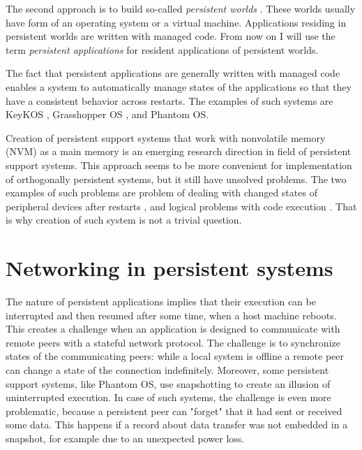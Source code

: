The second approach is to build so-called \textit{persistent worlds} 
\cite{atkinson1995orthogonally}. These worlds usually have form of an operating
system or a virtual machine. Applications residing in persistent worlds are
written with managed code. From now on I will use the term \textit{persistent
applications} for resident applications of persistent worlds.

The fact that persistent applications are generally written with managed code
enables a system to automatically manage states of the applications so that they
have a consistent behavior across restarts. The examples of such systems are
KeyKOS \cite{bomberger1992keykos}, Grasshopper OS \cite{dearle1994grasshopper},
and Phantom OS. 

Creation of persistent support systems that work with nonvolatile memory (NVM)
as a main memory is an emerging research direction in field of persistent
support systems. This approach seems to be more convenient for implementation of
orthogonally persistent systems, but it still have unsolved problems.  The two
examples of such problems are problem of dealing with changed states of
peripheral devices after restarts \cite{berthou2018peripheral}, and logical
problems with code execution \cite{ransford2014nonvolatile}. That is why
creation of such system is not a trivial question. 

\section{Networking in persistent systems}
\label{sec:lr:networking}

The nature of persistent applications implies that their execution can be
interrupted and then resumed after some time, when a host machine reboots. This
creates a challenge when an application is designed to communicate with remote
peers with a stateful network protocol. The challenge is to synchronize
states of the communicating peers: while a local system is offline a remote peer
can change a state of the connection indefinitely. Moreover, some persistent
support systems, like Phantom OS, use snapshotting to create an illusion of
uninterrupted execution. In case of such systems, the challenge is even more
problematic, because a persistent peer can "forget" that it had sent or received
some data. This happens if a record about data transfer was not embedded in a
snapshot, for example due to an unexpected power loss.


